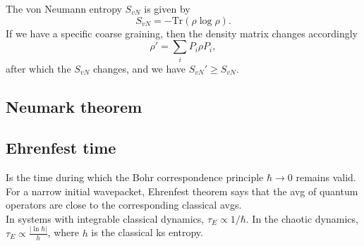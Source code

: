 \documentclass{article}
\begin{document}
The von Neumann entropy $S_{vN}$ is given by 
\begin{equation}
    S_{vN} = -\text{Tr}(\rho \log \rho).
\end{equation}
If we have a specific coarse graining, then the density matrix changes accordingly
\begin{equation}
    \rho' = \sum_iP_i\rho P_i,
\end{equation}
after which the $S_{vN}$ changes, and we have $S_{vN}' \geq S_{vN}$.

\subsection{Neumark theorem}
\subsection{Ehrenfest time}
Is the time during which the Bohr correspondence principle $\hbar \to 0$ remains valid. \\
For a narrow initial wavepacket, Ehrenfest theorem says that the avg of quantum operators are close to the corresponding classical avgs.\\
In systems with integrable classical dynamics, $\tau_E \propto 1/\hbar$. In the chaotic dynamics, $\tau_E \propto \frac{|\ln{\hbar}|}{h}$, where $h$ is the classical ks entropy. 
\end{document}
